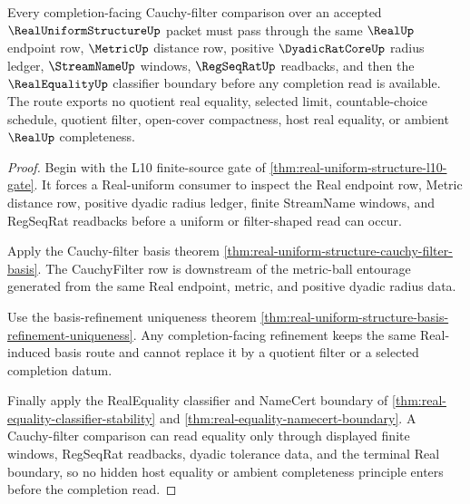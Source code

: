 \begin{theorem}
\label{thm:real-uniform-structure-real-equality-filter-boundary}
Every completion-facing Cauchy-filter comparison over an accepted $\RealUniformStructureUp$ packet must pass through the same $\RealUp$ endpoint row, $\MetricUp$ distance row, positive $\DyadicRatCoreUp$ radius ledger, $\StreamNameUp$ windows, $\RegSeqRatUp$ readbacks, and then the $\RealEqualityUp$ classifier boundary before any completion read is available. The route exports no quotient real equality, selected limit, countable-choice schedule, quotient filter, open-cover compactness, host real equality, or ambient $\RealUp$ completeness.
\end{theorem}
\begin{proof}
Begin with the L10 finite-source gate of \autoref{thm:real-uniform-structure-l10-gate}. It forces a Real-uniform consumer to inspect the Real endpoint row, Metric distance row, positive dyadic radius ledger, finite StreamName windows, and RegSeqRat readbacks before a uniform or filter-shaped read can occur.

Apply the Cauchy-filter basis theorem \autoref{thm:real-uniform-structure-cauchy-filter-basis}. The CauchyFilter row is downstream of the metric-ball entourage generated from the same Real endpoint, metric, and positive dyadic radius data.

Use the basis-refinement uniqueness theorem \autoref{thm:real-uniform-structure-basis-refinement-uniqueness}. Any completion-facing refinement keeps the same Real-induced basis route and cannot replace it by a quotient filter or a selected completion datum.

Finally apply the RealEquality classifier and NameCert boundary of \autoref{thm:real-equality-classifier-stability} and \autoref{thm:real-equality-namecert-boundary}. A Cauchy-filter comparison can read equality only through displayed finite windows, RegSeqRat readbacks, dyadic tolerance data, and the terminal Real boundary, so no hidden host equality or ambient completeness principle enters before the completion read.
\end{proof}

